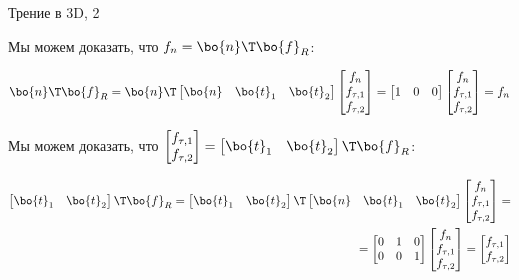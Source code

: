 \documentclass{beamer}
\begin{document}
\begin{frame}{Трение в 3D, 2}
	\begin{flushleft}
		
		Мы можем доказать, что $f_n = \bo{n}\T \bo{f}_R$:
		
		\begin{align}
			\bo{n}\T \bo{f}_R = 
			\bo{n}\T
			\begin{bmatrix}
				\bo{n} & \bo{t}_1 & \bo{t}_2
			\end{bmatrix}
			\begin{bmatrix}
				f_n \\ f_{\tau, 1} \\ f_{\tau, 2}
			\end{bmatrix}
			=
			\begin{bmatrix}
				1 & 0 & 0
			\end{bmatrix}
			\begin{bmatrix}
				f_n \\ f_{\tau, 1} \\ f_{\tau, 2}
			\end{bmatrix}
			=
			f_n 
		\end{align}
		
		
		Мы можем доказать, что $\begin{bmatrix}
			f_{\tau, 1} \\ f_{\tau, 2}
		\end{bmatrix} = 
		\begin{bmatrix}
			\bo{t}_1 & \bo{t}_2
		\end{bmatrix}\T \bo{f}_R$:
		
		\begin{align}
			\begin{bmatrix}
				\bo{t}_1 & \bo{t}_2
			\end{bmatrix}\T \bo{f}_R = 
			\begin{bmatrix}
				\bo{t}_1 & \bo{t}_2
			\end{bmatrix}\T
			\begin{bmatrix}
				\bo{n} & \bo{t}_1 & \bo{t}_2
			\end{bmatrix}
			\begin{bmatrix}
				f_n \\ f_{\tau, 1} \\ f_{\tau, 2}
			\end{bmatrix}
			= \\
			=
			\begin{bmatrix}
				0 & 1 & 0 \\
				0 & 0 & 1
			\end{bmatrix}
			\begin{bmatrix}
				f_n \\ f_{\tau, 1} \\ f_{\tau, 2}
			\end{bmatrix}
			=
			\begin{bmatrix}
				f_{\tau, 1} \\ f_{\tau, 2}
			\end{bmatrix}
		\end{align}
		
		
	\end{flushleft}
\end{frame}
\end{document}
